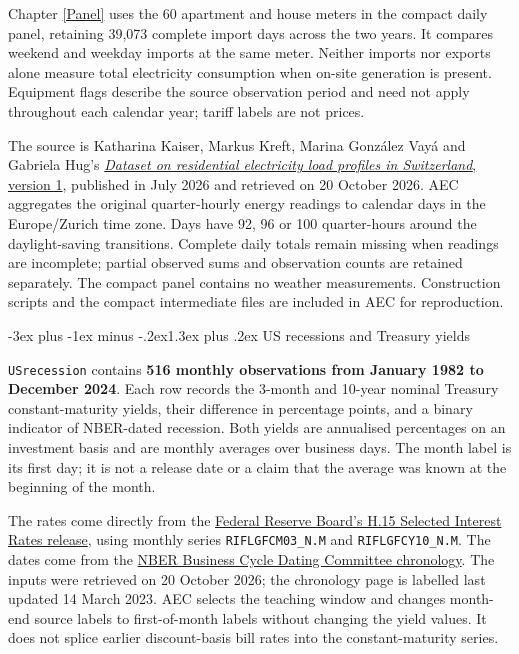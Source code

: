 \documentclass[
  11pt,
]{book}
\makeatletter
\renewcommand\section{\@startsection{section}{1}{\z@}
  {-3ex plus -1ex minus -.2ex}{1.3ex plus .2ex}
  {\normalfont\Large\bfseries\color{TextbookInk}}}
\theoremstyle{definition}
\theoremstyle{definition}
\theoremstyle{definition}
\theoremstyle{definition}
\theoremstyle{remark}
\makeatother
\begin{document}
Chapter \ref{Panel} uses the 60 apartment and house meters in the compact daily panel, retaining 39,073 complete import days across the two years. It compares weekend and weekday imports at the same meter. Neither imports nor exports alone measure total electricity consumption when on-site generation is present. Equipment flags describe the source observation period and need not apply throughout each calendar year; tariff labels are not prices.

The source is Katharina Kaiser, Markus Kreft, Marina González Vayá and Gabriela Hug's \href{https://doi.org/10.5281/zenodo.21398769}{\emph{Dataset on residential electricity load profiles in Switzerland}, version 1}, published in July 2026 and retrieved on 20 October 2026. AEC aggregates the original quarter-hourly energy readings to calendar days in the Europe/Zurich time zone. Days have 92, 96 or 100 quarter-hours around the daylight-saving transitions. Complete daily totals remain missing when readings are incomplete; partial observed sums and observation counts are retained separately. The compact panel contains no weather measurements. Construction scripts and the compact intermediate files are included in AEC for reproduction.

\section{US recessions and Treasury yields}\label{data-us-recession}

\texttt{USrecession} contains \textbf{516 monthly observations from January 1982 to December 2024}. Each row records the 3-month and 10-year nominal Treasury constant-maturity yields, their difference in percentage points, and a binary indicator of NBER-dated recession. Both yields are annualised percentages on an investment basis and are monthly averages over business days. The month label is its first day; it is not a release date or a claim that the average was known at the beginning of the month.

The rates come directly from the \href{https://www.federalreserve.gov/releases/h15/}{Federal Reserve Board's H.15 Selected Interest Rates release}, using monthly series \texttt{RIFLGFCM03\_N.M} and \texttt{RIFLGFCY10\_N.M}. The dates come from the \href{https://www.nber.org/research/data/us-business-cycle-expansions-and-contractions}{NBER Business Cycle Dating Committee chronology}. The inputs were retrieved on 20 October 2026; the chronology page is labelled last updated 14 March 2023. AEC selects the teaching window and changes month-end source labels to first-of-month labels without changing the yield values. It does not splice earlier discount-basis bill rates into the constant-maturity series.
\end{document}
